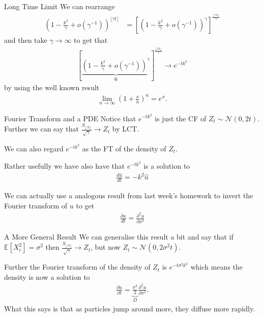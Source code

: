 \documentclass[pdf]{beamer}
\newcommand{\lra}{\longrightarrow}
\begin{document}
\begin{frame}{Long Time Limit}
    We can rearrange
    \begin{align}
        \left( 1- \frac{k^2}{\gamma} + o(\gamma^{-1}) \right)^{\lfloor \gamma t \rfloor}
        &= \left[ \left( 1- \frac{k^2}{\gamma} + o(\gamma^{-1}) \right)^\gamma \right]^\frac{{\lfloor \gamma t \rfloor}}{\gamma}
    \end{align}
    and then take $ \gamma \lra \infty $ to get that
    \begin{align}
    \left[ \underbrace{\left( 1- \frac{k^2}{\gamma} + o(\gamma^{-1}) \right)^\gamma}_{\circledast} \right]^\frac{{\lfloor \gamma t \rfloor}}{\gamma} \lra e^{-tk^2}
    \end{align}
    by using the well known result
    \begin{align}
        \lim_{n \lra \infty} \left(1 + \frac{x}{n}\right)^n = e^x.
    \end{align}
\end{frame}


\begin{frame}{Fourier Transform and a PDE}
    Notice that $ e^{-tk^2} $ is just the CF of $Z_t \sim \mathcal{N}(0,2t) $. Further we can say that $ \frac{S_{\lfloor \gamma t \rfloor}}{\sqrt{\gamma}} \lra Z_t $ by LCT.
    
    
    We can also regard $ e^{-tk^2} $ as the FT of the density of $ Z_t $.
    
    Rather usefully we have also have that $ e^{-tk^2} $ is a solution to 
    \begin{align}
        \frac{d\hat{u}}{dt} = -k^2\hat{u}
    \end{align}
    
    We can actually use a analogous result from last week's homework to invert the Fourier transform of $ u $ to get
    \begin{align}
        \frac{\partial u}{dt} = \frac{\partial^2 u}{\partial x^2}
    \end{align}
\end{frame}

\begin{frame}{A More General Result}
    We can generalise this result a bit and say that if $ \mathbb{E}[X_i^2] = \sigma^2 $
    then $ \frac{S_{\lfloor \gamma t \rfloor}}{\sqrt{\gamma}} \lra Z_{t} $, but now $ Z_t \sim \mathcal{N}(0,2\sigma^2 t) $.
    
    Further the Fourier transform of the density of $ Z_t $ is $ e^{-t\sigma^2k^2} $
    which means the density is now a solution to
    \begin{align}
        \frac{\partial u}{\partial t} = \underbrace{\frac{\sigma^2}{2}}_{D}\frac{\partial^2 u}{\partial x^2}.
    \end{align}
    What this says is that as particles jump around more, they diffuse more rapidly.
\end{frame}
\end{document}
